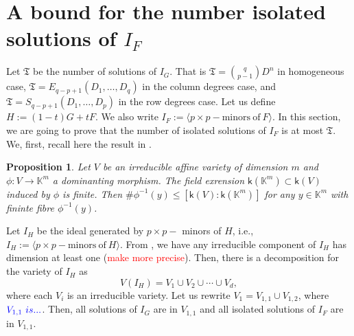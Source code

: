 \documentclass[11pt]{article}
\numberwithin{Property}{section}
\numberwithin{Theorem}{section}
\newtheorem{Proposition}{Proposition}%
\numberwithin{Proposition}{section}
\numberwithin{Lemma}{section}
\numberwithin{Corollary}{section}
\numberwithin{Definition}{section}
\numberwithin{Remark}{section}
\numberwithin{Conjecture}{section}
\numberwithin{Problem}{section}
\numberwithin{Example}{section}
\numberwithin{Claim}{section}
\renewcommand{\leq}{\leqslant}
\newcommand{\field}{\mathbb{K}} %
\newcommand{\todo}[1]{\textcolor{red}{#1}} %
\newcommand{\improve}[1]{\textcolor{blue}{#1}} %
\begin{document}
\section{A bound for the number isolated solutions of $I_F$}
Let $\mathfrak{T}$ be the number of solutions of $I_G$. That is $\mathfrak{T} = {q \choose {p-1}}D^n$ in homogeneous case, $\mathfrak{T} = E_{q-p+1}(D_1, \ldots, D_q)$ in the column degrees case, and $\mathfrak{T} = S_{q-p+1}(D_1, \ldots, D_p)$ in the row degrees case. Let us define $H := (1-t)G + tF$. We also write $I_F := \langle p \times p - \mathrm{minors \ of \ } F\rangle$. In this section, we are going to prove that the number of isolated solutions of $I_F$ is at most $\mathfrak{T}$. We, first, recall here the result in \cite[Proposition~1]{Hen83}. 
\begin{Proposition}\label{hen} Let $V$ be an irreducible affine variety of dimension $m$ and $\phi: V \to \field^m$ a dominanting morphism. The field exrension $\mathsf{k}(\field^m) \subset \mathsf{k}(V)$ induced by $\phi$ is finite. Then $\#\phi^{-1}(y) \leq [ \mathsf{k}(V) : \mathsf{k}(\field^m)]$ for any $y \in \field^m$ with fininte fibre $\phi^{-1}(y)$.
\end{Proposition}

Let $I_H$ be the ideal generated by $p \times p-$ minors of $H$, i.e., $I_H := \langle p \times p - \mathrm{minors \ of \ } H \rangle$. From \cite[Section~6]{Eagon188}, we have any irreducible component of $I_H$ has dimension at least one (\todo{make more precise}). Then, there is a decomposition for the variety of $I_H$ as 
\[
V(I_H) = V_1 \cup V_2 \cup \cdots \cup V_d, \] where each $V_i$
is an irreducible variety. Let us rewrite $V_1 = V_{1,1} \cup V_{1,2}$, where $\improve{V_{1,1} \ is ...} $. Then, all solutions of $I_G$ are in $V_{1,1}$ and all isolated solutions of $I_F$ are in $V_{1,1}$. 
\end{document}
